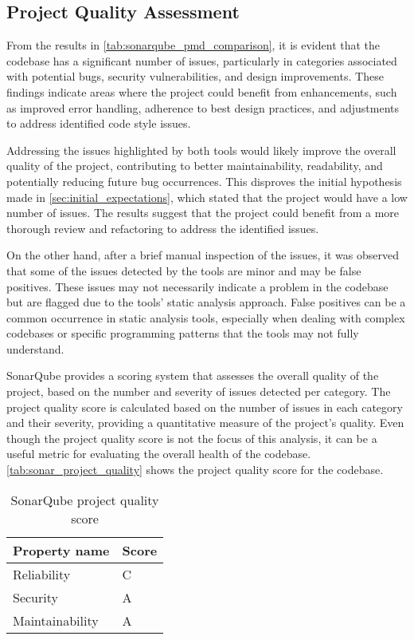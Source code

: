 \subsection{Project Quality Assessment}

From the results in \autoref{tab:sonarqube_pmd_comparison}, it is evident that the codebase has a significant number of issues, particularly in categories associated with potential bugs, security vulnerabilities, and design improvements. These findings indicate areas where the project could benefit from enhancements, such as improved error handling, adherence to best design practices, and adjustments to address identified code style issues.

Addressing the issues highlighted by both tools would likely improve the overall quality of the project, contributing to better maintainability, readability, and potentially reducing future bug occurrences. This disproves the initial hypothesis made in \autoref{sec:initial_expectations}, which stated that the project would have a low number of issues. The results suggest that the project could benefit from a more thorough review and refactoring to address the identified issues.

On the other hand, after a brief manual inspection of the issues, it was observed that some of the issues detected by the tools are minor and may be false positives. These issues may not necessarily indicate a problem in the codebase but are flagged due to the tools' static analysis approach. False positives can be a common occurrence in static analysis tools, especially when dealing with complex codebases or specific programming patterns that the tools may not fully understand.

SonarQube provides a scoring system that assesses the overall quality of the project, based on the number and severity of issues detected per category. The project quality score is calculated based on the number of issues in each category and their severity, providing a quantitative measure of the project's quality. Even though the project quality score is not the focus of this analysis, it can be a useful metric for evaluating the overall health of the codebase. \autoref{tab:sonar_project_quality} shows the project quality score for the codebase.

\begin{table}[H]
  \caption{SonarQube project quality score}
  \label{tab:sonar_project_quality}
  \begin{center}
    \begin{tabular}[c]{l|l}
      \hline
      \multicolumn{1}{c|}{\textbf{Property name}} & 
      \multicolumn{1}{c}{\textbf{Score}} \\
      \hline
      Reliability & C \\
      Security & A \\
      Maintainability & A \\
      \hline
    \end{tabular}
  \end{center}
\end{table}

